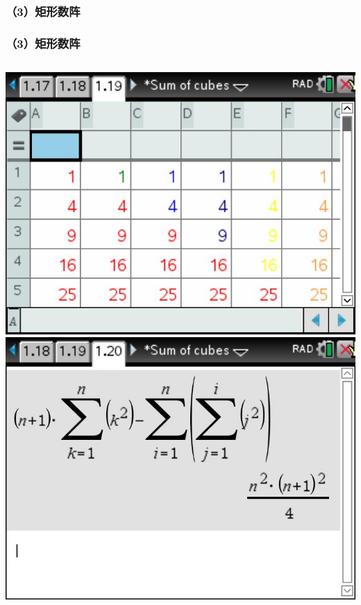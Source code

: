 \documentclass[aspectratio=169]{beamer}
\begin{document}
 
\subsubsection{（3）矩形数阵}
       \begin{frame}
      \frametitle{（3）矩形数阵}
      \begin{columns}
      	\includegraphics[scale=0.3]{矩形数阵.jpg}
      	\vspace{2cm}
      	\includegraphics[scale=0.3]{矩形数阵和式.jpg}
      	\vspace{2cm}
      \end{columns}      
  \end{frame}
\end{document}

